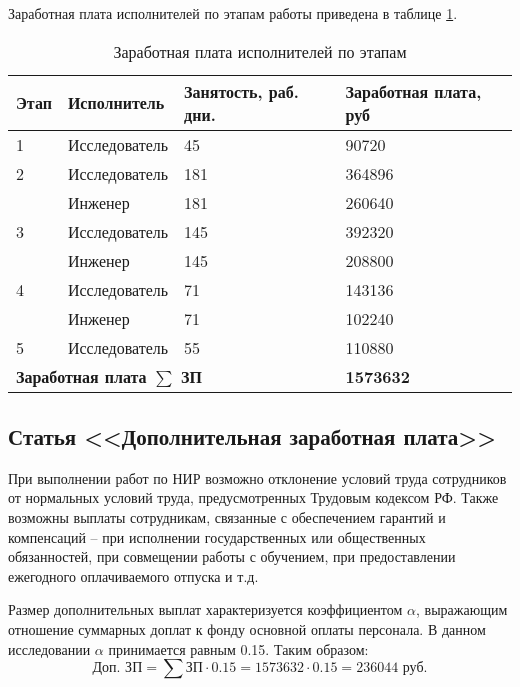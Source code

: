 Заработная плата исполнителей по этапам работы приведена в таблице \ref{tab:eocn_grades_etap}.

\begin{table}[h]
	\begin{center}
		\caption{Заработная плата исполнителей по этапам}
		\begin{tabular}{|l|l|l|l|}
		\hline
Этап & Исполнитель & Занятость, раб. дни. & Заработная плата, руб \\ \hline
1 & Исследователь & 45 & 90720 \\ \hline
2 & Исследователь & 181 & 364896 \\ \cline{2-4}
 & Инженер & 181 & 260640 \\ \hline
3 & Исследователь & 145 & 392320 \\ \cline{2-4}
 & Инженер & 145 & 208800 \\ \hline
4 & Исследователь & 71 & 143136 \\ \cline{2-4}
 & Инженер & 71 & 102240 \\ \hline
5 & Исследователь & 55 & 110880 \\ \hline
 \multicolumn{3}{|p{100mm}|}{\textbf{Заработная плата $\sum $ ЗП} } & \textbf{1573632} \\
 \hline
		\end{tabular}
		\label{tab:eocn_grades_etap}
	\end{center}
\end{table}


\subsection{Статья <<Дополнительная заработная плата>>}
При выполнении работ по НИР возможно отклонение условий труда сотрудников от нормальных условий труда, предусмотренных Трудовым кодексом РФ. Также возможны выплаты сотрудникам, связанные с обеспечением гарантий и компенсаций – при исполнении государственных или общественных обязанностей, при совмещении работы с обучением, при предоставлении ежегодного оплачиваемого отпуска и т.д.

Размер дополнительных выплат характеризуется коэффициентом $\alpha$, выражающим отношение суммарных доплат к фонду основной оплаты персонала. В данном исследовании $\alpha$ принимается равным 0.15. Таким образом: $$\text{Доп. ЗП} = \sum \text{ЗП} \cdot 0.15 = 1573632 \cdot 0.15 = 236044 \text{ руб.} $$

